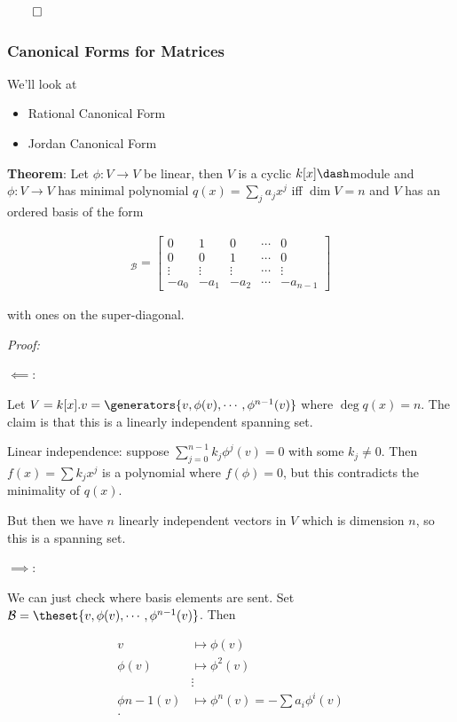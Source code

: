 \(\qed\)

\hypertarget{canonical-forms-for-matrices}{%
\subsubsection{Canonical Forms for
Matrices}\label{canonical-forms-for-matrices}}

We'll look at

\begin{itemize}
\item
  Rational Canonical Form
\item
  Jordan Canonical Form
\end{itemize}

\textbf{Theorem}: Let \(\phi: V\to V\) be linear, then \(V\) is a cyclic
\(k[x]\dash\)module and \(\phi: V\to V\) has minimal polynomial
\(q(x) = \sum_j a_j x^j\) iff \(\dim V = n\) and \(V\) has an ordered
basis of the form

\begin{align*}
[\phi]_{\mathcal{B}} = \left[
\begin{array}{ccccc}
0 & 1 & 0 & \cdots & 0 \\
0 & 0 & 1 & \cdots & 0 \\
\vdots & \vdots & \vdots & \cdots & \vdots \\
-a_0 & -a_1 & -a_2 & \cdots & -a_{n-1}
\end{array}
\right]
\end{align*}

with ones on the super-diagonal.

\emph{Proof:}

\(\impliedby\):

Let \(V = k[x].v = \generators{v, \phi(v), \cdots, \phi^{n-1}(v)}\)
where \(\deg q(x) = n\). The claim is that this is a linearly
independent spanning set.

Linear independence: suppose \(\sum_{j=0}^{n-1} k_j \phi^j(v) = 0\) with
some \(k_j \neq 0\). Then \(f(x) = \sum k_j x^j\) is a polynomial where
\(f(\phi) = 0\), but this contradicts the minimality of \(q(x)\).

But then we have \(n\) linearly independent vectors in \(V\) which is
dimension \(n\), so this is a spanning set.

\(\implies\):

We can just check where basis elements are sent. Set
\(\mathcal{B} = \theset{v, \phi(v), \cdots, \phi^{n-1}(v)}\). Then

\begin{align*}
v &\mapsto \phi(v) \\
\phi(v) &\mapsto \phi^2(v) \\
&\vdots \\
\phi{n-1}(v) &\mapsto \phi^n(v)  = -\sum a_i \phi^i(v) \\
.\end{align*}

